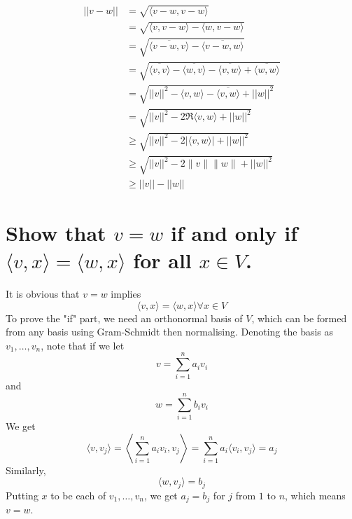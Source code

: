 \documentclass[answers]{exam}
\begin{document}
\begin{questions}
\begin{parts}
\begin{solution}
	\begin{align*}
		||v-w|| &= \sqrt{\langle v-w,v-w \rangle} \\
			&= \sqrt{\langle v,v-w \rangle - \langle w,v-w \rangle} \\
			&= \sqrt{\overline{\langle v-w,v \rangle} - \overline{\langle v-w,w \rangle}} \\
			&= \sqrt{\overline{\langle v,v \rangle} - \overline{\langle w,v \rangle} - \overline{\langle v,w \rangle} + \overline{\langle w,w \rangle}} \\
			&= \sqrt{||v||^2 - \langle v,w \rangle - \overline{\langle v,w \rangle} + ||w||^2} \\
			&= \sqrt{||v||^2 - 2\Re \langle v,w \rangle + ||w||^2} \\
			&\geq \sqrt{||v||^2 - 2|\langle v,w \rangle| + ||w||^2} \\
			&\geq \sqrt{||v||^2 - 2\lVert v \rVert \lVert w \rVert + ||w||^2} \\
			&\geq ||v|| - ||w||
	\end{align*}
\end{solution}

\part{Show that $v=w$ if and only if $\langle v,x \rangle = \langle w,x \rangle$ for all $x \in V$.}

\begin{solution}
	It is obvious that $v=w$ implies
	$$\langle v,x \rangle = \langle w,x \rangle \forall x \in V$$
	To prove the "if" part, we need an orthonormal basis of $V$, which can be formed from any basis using Gram-Schmidt then normalising. Denoting the basis as $v_1,\dots,v_n$, note that if we let
	$$v = \sum_{i=1}^n a_iv_i$$
	and
	$$w = \sum_{i=1}^n b_iv_i$$
	We get
	$$\langle v,v_j \rangle = \left\langle \sum_{i=1}^n a_iv_i,v_j \right\rangle = \sum_{i=1}^n a_i \langle v_i,v_j \rangle = a_j$$
	Similarly,
	$$\langle w,v_j \rangle = b_j$$
	Putting $x$ to be each of $v_1,\dots,v_n$, we get $a_j=b_j$ for $j$ from $1$ to $n$, which means $v=w$.
\end{solution}

\end{parts}



\end{questions}
\end{document}
